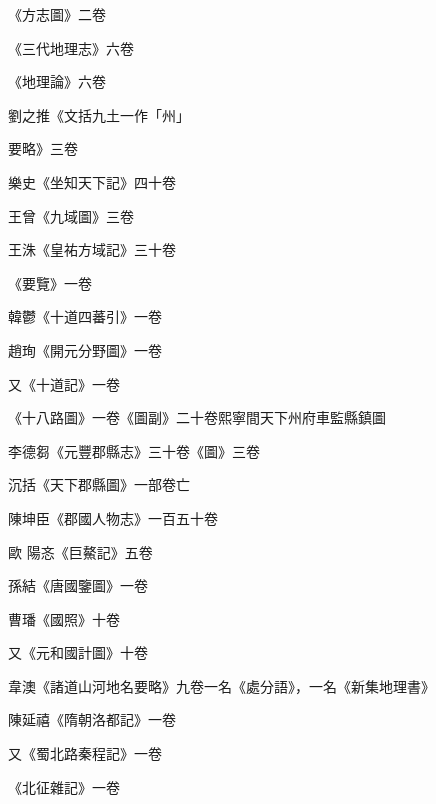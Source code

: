 \begin{pinyinscope}
 《方志圖》二卷



 《三代地理志》六卷



 《地理論》六卷



 劉之推《文括九土一作「州」



 要略》三卷



 樂史《坐知天下記》四十卷



 王曾《九域圖》三卷



 王洙《皇祐方域記》三十卷



 《要覽》一卷



 韓鬱《十道四蕃引》一卷



 趙珣《開元分野圖》一卷



 又《十道記》一卷



 《十八路圖》一卷《圖副》二十卷熙寧間天下州府車監縣鎮圖



 李德芻《元豐郡縣志》三十卷《圖》三卷



 沉括《天下郡縣圖》一部卷亡



 陳坤臣《郡國人物志》一百五十卷



 歐
 陽忞《巨鰲記》五卷



 孫結《唐國鑒圖》一卷



 曹璠《國照》十卷



 又《元和國計圖》十卷



 韋澳《諸道山河地名要略》九卷一名《處分語》，一名《新集地理書》



 陳延禧《隋朝洛都記》一卷



 又《蜀北路秦程記》一卷



 《北征雜記》一卷




\end{pinyinscope}
